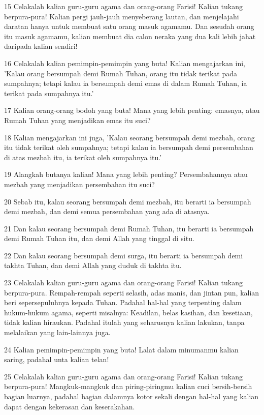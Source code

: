 \par 15 Celakalah kalian guru-guru agama dan orang-orang Farisi! Kalian tukang berpura-pura! Kalian pergi jauh-jauh menyeberang lautan, dan menjelajahi daratan hanya untuk membuat satu orang masuk agamamu. Dan sesudah orang itu masuk agamamu, kalian membuat dia calon neraka yang dua kali lebih jahat daripada kalian sendiri!
\par 16 Celakalah kalian pemimpin-pemimpin yang buta! Kalian mengajarkan ini, 'Kalau orang bersumpah demi Rumah Tuhan, orang itu tidak terikat pada sumpahnya; tetapi kalau ia bersumpah demi emas di dalam Rumah Tuhan, ia terikat pada sumpahnya itu.'
\par 17 Kalian orang-orang bodoh yang buta! Mana yang lebih penting: emasnya, atau Rumah Tuhan yang menjadikan emas itu suci?
\par 18 Kalian mengajarkan ini juga, 'Kalau seorang bersumpah demi mezbah, orang itu tidak terikat oleh sumpahnya; tetapi kalau ia bersumpah demi persembahan di atas mezbah itu, ia terikat oleh sumpahnya itu.'
\par 19 Alangkah butanya kalian! Mana yang lebih penting? Persembahannya atau mezbah yang menjadikan persembahan itu suci?
\par 20 Sebab itu, kalau seorang bersumpah demi mezbah, itu berarti ia bersumpah demi mezbah, dan demi semua persembahan yang ada di atasnya.
\par 21 Dan kalau seorang bersumpah demi Rumah Tuhan, itu berarti ia bersumpah demi Rumah Tuhan itu, dan demi Allah yang tinggal di situ.
\par 22 Dan kalau seorang bersumpah demi surga, itu berarti ia bersumpah demi takhta Tuhan, dan demi Allah yang duduk di takhta itu.
\par 23 Celakalah kalian guru-guru agama dan orang-orang Farisi! Kalian tukang berpura-pura. Rempah-rempah seperti selasih, adas manis, dan jintan pun, kalian beri sepersepuluhnya kepada Tuhan. Padahal hal-hal yang terpenting dalam hukum-hukum agama, seperti misalnya: Keadilan, belas kasihan, dan kesetiaan, tidak kalian hiraukan. Padahal itulah yang seharusnya kalian lakukan, tanpa melalaikan yang lain-lainnya juga.
\par 24 Kalian pemimpin-pemimpin yang buta! Lalat dalam minumanmu kalian saring, padahal unta kalian telan!
\par 25 Celakalah kalian guru-guru agama dan orang-orang Farisi! Kalian tukang berpura-pura! Mangkuk-mangkuk dan piring-piringmu kalian cuci bersih-bersih bagian luarnya, padahal bagian dalamnya kotor sekali dengan hal-hal yang kalian dapat dengan kekerasan dan keserakahan.
